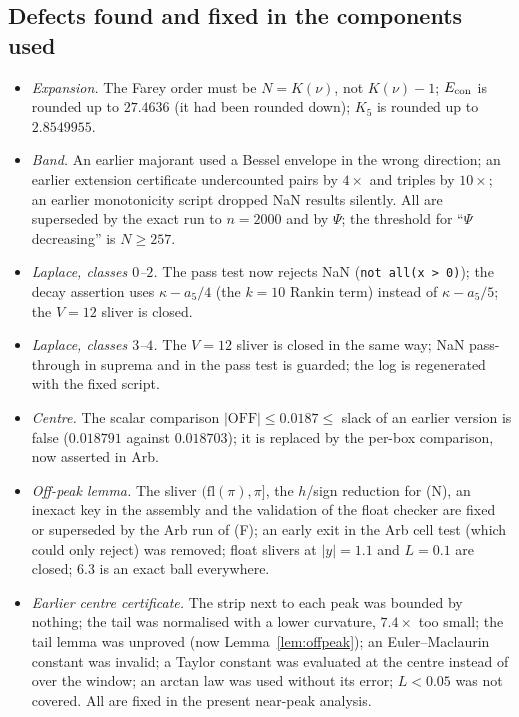 \subsection{Defects found and fixed in the components used}
\begin{itemize}
\item \emph{Expansion.} The Farey order must be $N=K(\nu)$, not $K(\nu)-1$; $E_{\mathrm{con}}$ is rounded up to $27.4636$ (it had been
rounded down); $K_5$ is rounded up to $2.8549955$.
\item \emph{Band.} An earlier majorant used a Bessel envelope in the wrong direction; an earlier extension certificate
undercounted pairs by $4\times$ and triples by $10\times$; an earlier monotonicity script dropped NaN results silently. All
are superseded by the exact run to $n=2000$ and by $\Psi$; the threshold for ``$\Psi$ decreasing'' is $N\ge257$.
\item \emph{Laplace, classes $0$--$2$.} The pass test now rejects NaN (\texttt{not all(x > 0)}); the decay assertion uses
$\kappa-a_5/4$ (the $k=10$ Rankin term) instead of $\kappa-a_5/5$; the $V=12$ sliver is closed.
\item \emph{Laplace, classes $3$--$4$.} The $V=12$ sliver is closed in the same way; NaN pass-through in suprema and in the
pass test is guarded; the log is regenerated with the fixed script.
\item \emph{Centre.} The scalar comparison $|\mathrm{OFF}|\le0.0187\le$ slack of an earlier version is false
($0.018791$ against $0.018703$); it is replaced by the per-box comparison, now asserted in Arb.
\item \emph{Off-peak lemma.} The sliver $(\mathrm{fl}(\pi),\pi]$, the $h$/sign reduction for (N), an inexact key in the
assembly and the validation of the float checker are fixed or superseded by the Arb run of (F); an early exit in the Arb
cell test (which could only reject) was removed; float slivers at $|y|=1.1$ and $L=0.1$ are closed; $6.3$ is an exact ball
everywhere.
\item \emph{Earlier centre certificate.} The strip next to each peak was bounded by nothing; the tail was normalised with a
lower curvature, $7.4\times$ too small; the tail lemma was unproved (now Lemma~\ref{lem:offpeak}); an Euler--Maclaurin
constant was invalid; a Taylor constant was evaluated at the centre instead of over the window; an arctan law was used
without its error; $L<0.05$ was not covered. All are fixed in the present near-peak analysis.
\end{itemize}

